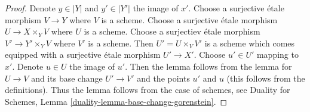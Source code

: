 \documentclass[10pt,a4paper]{amsart}
\theoremstyle{plain}
\theoremstyle{definition}
\theoremstyle{remark}
\numberwithin{equation}{subsection}
\begin{document}
\begin{proof}
Denote $y \in |Y|$ and $y' \in |Y'|$ the image of $x'$.
Choose a surjective \'etale morphism $V \to Y$ where $V$ is a scheme.
Choose a surjective \'etale morphism $U \to X \times_Y V$ where
$U$ is a scheme.
Choose a surjectiev \'etale morphism $V' \to Y' \times_Y V$
where $V'$ is a scheme.
Then $U' = U \times_V V'$ is a scheme which comes equipped
with a surjective \'etale morphism $U' \to X'$.
Choose $u' \in U'$ mapping to $x'$. Denote $u \in U$ the image of $u'$.
Then the lemma follows from the lemma for
$U \to V$ and its base change $U' \to V'$ and the
points $u'$ and $u$ (this follows from the definitions).
Thus the lemma follows from the case of schemes, see
Duality for Schemes, Lemma \ref{duality-lemma-base-change-gorenstein}.
\end{proof}
\end{document}
